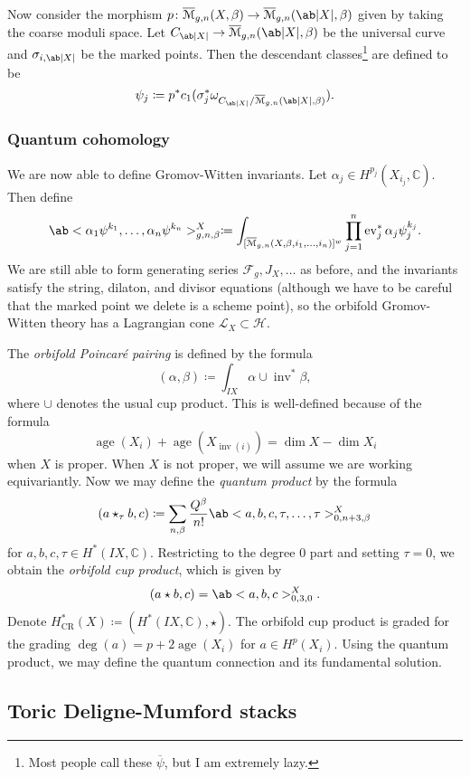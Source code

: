 \documentclass[leqno, openany]{memoir}
\theoremstyle{definition}
\theoremstyle{remark}
\theoremstyle{plain}
\theoremstyle{definition}
\theoremstyle{remark}
\newcommand{\C}{\mathbb{C}}
\newcommand{\mc}[1]{\mathcal{#1}}
\newcommand{\mr}[1]{\mathrm{#1}}
\newcommand{\on}[1]{\operatorname{#1}}
\newcommand{\ol}[1]{\overline{#1}}
\begin{document}
Now consider the morphism $p \colon \ol{\mc{M}}_{g,n}(X,\beta) \to \ol{\mc{M}}_{g,n}(\ab|X|,\beta)$ given by taking the coarse moduli space. Let $C_{\ab|X|} \to \ol{\mc{M}}_{g,n}(\ab|X|,\beta)$ be the universal curve and $\sigma_{i,\ab|X|}$ be the marked points. Then the descendant classes\footnote{Most people call these $\ol{\psi}$, but I am extremely lazy.} are defined to be
\[ \psi_j \coloneqq p^* c_1(\sigma_j^* \omega_{C_{\ab|X|} / \ol{\mc{M}}_{g,n}(\ab|X|,\beta)}). \]

\subsubsection{Quantum cohomology}%
\label{ssub:Quantum cohomology}

We are now able to define Gromov-Witten invariants. Let $\alpha_j \in H^{p_j}(X_{i_j}, \C)$. Then define
\[ \ab<\alpha_1 \psi^{k_1},\ldots,\alpha_n \psi^{k_n}>_{g,n,\beta}^X \coloneqq \int_{[ \ol{\mc{M}}_{g,n}(X,\beta,i_1,\ldots,i_n) ]^w} \prod_{j=1}^n \on{ev}_j^* \alpha_j \psi_j^{k_j}. \]
We are still able to form generating series $\mc{F}_g, J_X,\ldots$ as before, and the invariants satisfy the string, dilaton, and divisor equations (although we have to be careful that the marked point we delete is a scheme point), so the orbifold Gromov-Witten theory has a Lagrangian cone $\mc{L}_X \subset \mc{H}$.

The \textit{orbifold Poincar\'e pairing} is defined by the formula
\[ (\alpha,\beta) \coloneqq \int_{IX} \alpha \cup \on{inv}^* \beta, \]
where $\cup$ denotes the usual cup product. This is well-defined because of the formula
\[ \on{age}(X_i) + \on{age}(X_{\on{inv}(i)}) = \dim X - \dim X_i \]
when $X$ is proper. When $X$ is not proper, we will assume we are working equivariantly.
Now we may define the \textit{quantum product} by the formula
\[ (a \star_{\tau} b, c) \coloneqq \sum_{n,\beta} \frac{Q^{\beta}}{n!} \ab<a,b,c,\tau,\ldots,\tau>_{0,n+3,\beta}^X \]
for $a,b,c,\tau \in H^*(IX, \C)$. Restricting to the degree $0$ part and setting $\tau = 0$, we obtain the \textit{orbifold cup product}, which is given by
\[ (a \star b, c) = \ab<a,b,c>_{0,3,0}^X. \]
Denote $H^*_{\mr{CR}}(X) \coloneqq (H^*(IX, \C), \star)$. The orbifold cup product is graded for the grading $\deg(a) = p + 2 \on{age}(X_i)$ for $a \in H^p(X_i)$. Using the quantum product, we may define the quantum connection and its fundamental solution.

\subsection{Toric Deligne-Mumford stacks}%
\label{sub:Toric Deligne-Mumford stacks}
\end{document}
